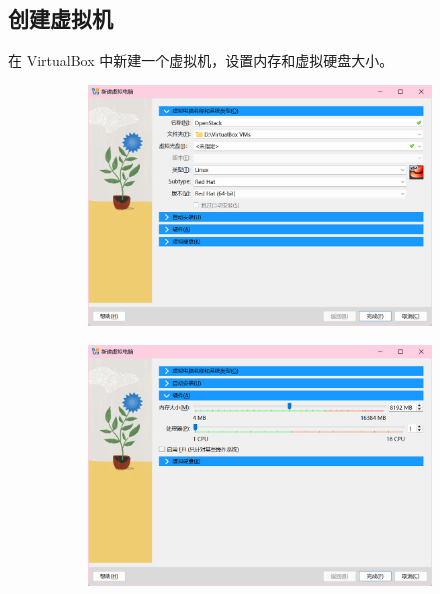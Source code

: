 \documentclass{article}
\begin{document}
\subsection{创建虚拟机}

在 VirtualBox 中新建一个虚拟机，设置内存和虚拟硬盘大小。

\begin{figure}[H]
    \centering
    \begin{subfigure}[b]{0.9\textwidth}
        \includegraphics[width=\textwidth]{img/2.1.png}
    \end{subfigure}
    \begin{subfigure}[b]{0.45\textwidth}
        \includegraphics[width=\textwidth]{img/2.2.png}
    \end{subfigure}
    \begin{subfigure}[b]{0.45\textwidth}

\end{subfigure}
\end{figure}
\end{document}
